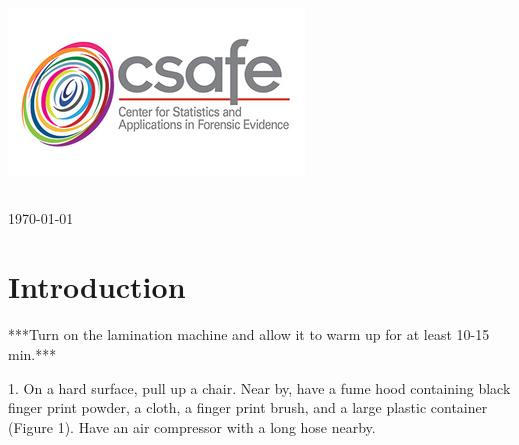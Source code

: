 \begin{titlepage}
\includegraphics[scale=.5]{Logo}\\[1cm]

\begin{center}
\begin{tabular}{ c   |   c } 
 
\end{tabular}
\end{center}

{\large \today}\\[2cm] %



 

\vfill %

\end{titlepage}


\section{Introduction}
***Turn on the lamination machine and allow it to warm up for at least 10-15 min.*** 

1. On a hard surface, pull up a chair. Near by, have a fume hood containing black finger print powder, a cloth, a finger print brush, and a large plastic container (Figure 1). Have an air compressor with a long hose nearby.  

